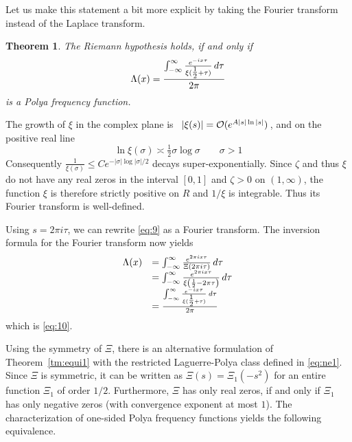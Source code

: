 \documentclass{article}
\newtheorem{tm}{Theorem}
\newcommand{\fif}{if and only if}
\newtheorem{tm}{Theorem}
\providecommand{\*}{{\opl}}
\newcommand{\field}[1]{#1}
\newcommand{\bR}{\field{R}}
\newcommand{\cO}{\mathcal{O}}
\newcommand{\<}{}
\newcommand{\>}{}
\newcommand{\lpc}{Laguerre-Polya class}
\newcommand{\pff}{Polya frequency function}
\begin{document}
Let us make this statement a bit more explicit by taking the Fourier transform
instead of the Laplace transform.

\begin{tm}
  \label{tm:equi2}The Riemann hypothesis holds, {\fif}
  \begin{equation}
    \label{eq:10} \Lambda (x) = \frac{\int_{- \infty}^{\infty} \frac{e^{- ix
    \tau}}{\xi (\tfrac{1}{2} + \tau)}  \hspace{0.17em} d \tau}{2 \pi} 
  \end{equation}
  is a Polya frequency function.
\end{tm}

The growth of $\xi$ in the complex plane is~{\cite{Tit86}} $| \xi (s) | = \cO
(e^{A|s| \ln |s|}) \hspace{0.17em}$, and on the positive real line
\begin{equation}
  \ln \xi (\sigma) \asymp \tfrac{1}{2} \sigma \log \sigma \qquad \sigma > 1
\end{equation}
Consequently $\frac{1}{\xi (\sigma)} \leq Ce^{- | \sigma | \log | \sigma | /
2}$ decays super-exponentially. Since $\zeta$ and thus $\xi$ do not have any
real zeros in the interval $[0, 1]$ and $\zeta > 0$ on $(1, \infty)$, the
function $\xi$ is therefore strictly positive on $\bR$ and $1 / \xi$ is
integrable. Thus its Fourier transform is well-defined.

Using $s = 2 \pi i \tau$, we can rewrite \eqref{eq:9} as a Fourier transform.
The inversion formula for the Fourier transform now yields
\begin{equation}
  \begin{array}{ll}
    \Lambda (x) & = \int_{- \infty}^{\infty} \frac{e^{2 \pi ix \tau}}{\Xi (2
    \pi i \tau)}  \hspace{0.17em} d \tau\\
    & = \int_{- \infty}^{\infty} \frac{e^{2 \pi ix \tau}}{\xi \left(
    \frac{1}{2} - 2 \pi \tau \right)}  \hspace{0.17em} d \tau
    \hspace{0.17em}\\
    & = \frac{\int_{- \infty}^{\infty} \frac{e^{- ix \tau}}{\xi (\tfrac{1}{2}
    + \tau)}  \hspace{0.17em} d \tau}{2 \pi}
  \end{array}
\end{equation}
which is \eqref{eq:10}.

Using the symmetry of $\Xi$, there is an alternative formulation of
Theorem~\ref{tm:equi1} with the restricted {\lpc} defined in \eqref{eq:ne1}.
Since $\Xi$ is symmetric, it can be written as $\Xi (s) = \Xi_1  (- s^2)$ for
an entire function $\Xi_1$ of order $1 / 2$. Furthermore, $\Xi$ has only real
zeros, {\fif} $\Xi_1$ has only negative zeros (with convergence exponent at
most $1$). The characterization of one-sided {\pff}s yields the following
equivalence.
\end{document}
